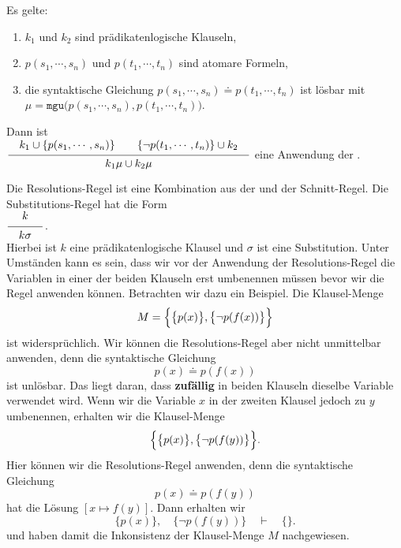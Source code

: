 \begin{Definition} 
    Es gelte:
    \begin{enumerate}
    \item $k_1$ und $k_2$ sind prädikatenlogische Klauseln,
    \item $p(s_1,\cdots,s_n)$ und $p(t_1,\cdots,t_n)$ sind atomare Formeln,
    \item die syntaktische Gleichung $p(s_1,\cdots,s_n)  \doteq p(t_1,\cdots,t_n)$ ist lösbar mit 
          \\[0.2cm]
          \hspace*{1.3cm}
          $\mu = \mathtt{mgu}\bigl(p(s_1,\cdots,s_n), p(t_1,\cdots,t_n)\bigr)$. 
    \end{enumerate}
     Dann ist 
     \\[0.2cm]
     \hspace*{1.3cm}
     $\schluss{k_1 \cup\{ p(s_1,\cdots,s_n)\} \quad\quad \{\neg p(t_1,\cdots,t_n)\} \cup k_2}{
                 k_1\mu \cup k_2\mu} 
     $
     eine Anwendung der .
     \eox
\end{Definition}
Die Resolutions-Regel ist eine Kombination aus der  und der 
Schnitt-Regel.  Die Substitutions-Regel hat die Form
\\[0.2cm]
\hspace*{1.3cm}
$\schluss{k}{k\sigma}$. 
\\[0.2cm]
Hierbei ist $k$ eine prädikatenlogische Klausel und $\sigma$ ist eine Substitution.
Unter Umständen kann es sein, dass wir vor der Anwendung der Resolutions-Regel 
die Variablen in einer der beiden Klauseln erst umbenennen
müssen bevor wir die Regel anwenden können.  Betrachten wir dazu ein Beispiel.
Die Klausel-Menge 
\[ M = \Bigl\{ \bigl\{ p(x) \bigr\}, \bigl\{ \neg p(f(x)) \bigr\} \Bigr\} \]
ist widersprüchlich.  Wir können die Resolutions-Regel aber nicht unmittelbar anwenden,
denn die syntaktische Gleichung 
\[ p(x) \doteq p(f(x)) \]
ist unlösbar.  Das liegt daran, dass \textbf{zufällig} in beiden Klauseln dieselbe Variable
verwendet wird.  Wenn wir die Variable $x$ in der zweiten Klausel jedoch zu $y$ umbenennen, erhalten
wir die Klausel-Menge 
\[ \Bigl\{ \bigl\{ p(x) \bigr\}, \bigl\{ \neg p(f(y)) \bigr\} \Bigr\}. \]
Hier können wir die Resolutions-Regel anwenden, denn die syntaktische Gleichung 
\[ p(x) \doteq p(f(y)) \]
hat die Lösung $[x \mapsto f(y)]$.  Dann erhalten wir 
\[ \bigl\{ p(x) \bigr\}, \quad \bigl\{ \neg p(f(y)) \bigr\} \quad \vdash \quad \{\}. \]
und haben damit die Inkonsistenz der Klausel-Menge $M$ nachgewiesen.

